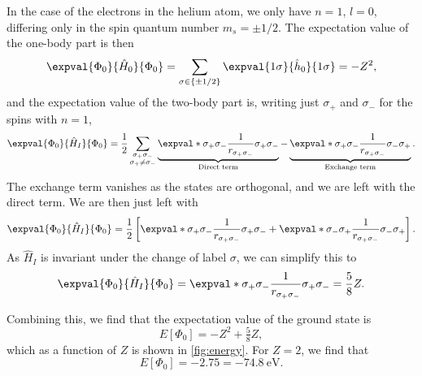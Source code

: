 In the case of the electrons in the helium atom, we only have $n = 1$, $l = 0$, differing only in the spin quantum number $m_s = \pm 1/2$.
The expectation value of the one-body part is then
\begin{equation*}
    \expval{\Phi_0}{\hat{H}_0}{\Phi_0} = \sum_{\sigma \in \{\pm 1/2\}} \expval{1\sigma}{\hat{h}_0}{1\sigma} = -Z^2,
\end{equation*}
and the expectation value of the two-body part is, writing just $\sigma_{+}$ and $\sigma_{-}$ for the spins with $n = 1$,
\begin{equation*}
    \expval{\Phi_0}{\hat{H}_I}{\Phi_0}
    = \frac{1}{2} \sum_{\substack{\sigma_{+}\sigma_{-}\\ \sigma_{+} \neq \sigma_{-}}}
    \underbrace{\expval*{\sigma_{+} \sigma_{-}}{\frac{1}{r_{\sigma_{+}\sigma_{-}}}}{\sigma_{+} \sigma_{-}}}_{\textnormal{Direct term}}
    - \underbrace{\expval*{\sigma_{+} \sigma_{-}}{\frac{1}{r_{\sigma_{+}\sigma_{-}}}}{\sigma_{-}\sigma_{+}}}_{\textnormal{Exchange term}}.
\end{equation*}
The exchange term vanishes as the states are orthogonal, and we are left with the direct term.
We are then just left with
\begin{equation*}
    \expval{\Phi_0}{\hat{H}_I}{\Phi_0} = \frac{1}{2}\left[ \expval*{\sigma_{+} \sigma_{-}}{\frac{1}{r_{\sigma_{+} \sigma_{-}}}}{\sigma_{+} \sigma_{-}} + \expval*{\sigma_{-} \sigma_{+}}{\frac{1}{r_{\sigma_{+} \sigma_{-}}}}{\sigma_{-} \sigma_{+}}\right].
\end{equation*}
As $\hat{H}_I$ is invariant under the change of label $\sigma$, we can simplify this to
\begin{equation*}
    \expval{\Phi_0}{\hat{H}_I}{\Phi_0} = \expval*{\sigma_{+} \sigma_{-}}{\frac{1}{r_{\sigma_{+} \sigma_{-}}}}{\sigma_{+} \sigma_{-}} = \frac{5}{8} Z.
\end{equation*}

Combining this, we find that the expectation value of the ground state is
\begin{equation}
    E[\Phi_0] = -Z^2 + \tfrac{5}{8}Z,
\end{equation}
which as a function of $Z$ is shown in \autoref{fig:energy}.
For $Z = 2$, we find that
\begin{equation}
    E[\Phi_0] = -2.75 = -74.8 \ \text{eV}.
\end{equation}

